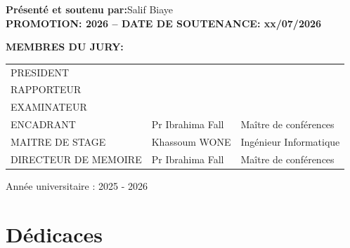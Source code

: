 \documentclass[a4paper,12pt]{report}
\begin{document}
\noindent\textbf{Présenté et soutenu par:}\quad Salif Biaye\\[0.15cm]
\textbf{\quad PROMOTION: 2026 \;--\; DATE DE SOUTENANCE: xx/07/2026}

 

\textcolor{bleuESP}{\textbf{MEMBRES DU JURY:}}

\vspace{0.15cm}
\noindent
\begin{tabular}{@{}p{4.5cm} p{5cm} p{4.5cm}@{}}
  \textcolor{bleuESP}{PRESIDENT}            & & \\[2pt]
  \textcolor{bleuESP}{RAPPORTEUR}           & & \\[2pt]
  \textcolor{bleuESP}{EXAMINATEUR}          & & \\[2pt]
  \textcolor{bleuESP}{ENCADRANT}            & Pr Ibrahima Fall  & Maître de conférences \\[2pt]
  \textcolor{bleuESP}{MAITRE DE STAGE}      & Khassoum WONE     & Ingénieur Informatique \\[2pt]
  \textcolor{bleuESP}{DIRECTEUR DE MEMOIRE} & Pr Ibrahima Fall  & Maître de conférences \\
\end{tabular}

\vfill

\begin{tcolorbox}[
  enhanced,
  arc=4pt, boxrule=1.5pt,
  left=6pt, right=6pt, top=5pt, bottom=5pt,
  colback=white, colframe=bleuESP,
  halign=center,
]
  
  \small Année universitaire : 2025 - 2026\\[0.1cm]
  
\end{tcolorbox}

\cleardoublepage

\hypersetup{pageanchor=true}
\setcounter{page}{1}


\chapter*{Dédicaces}
{}
\end{document}
